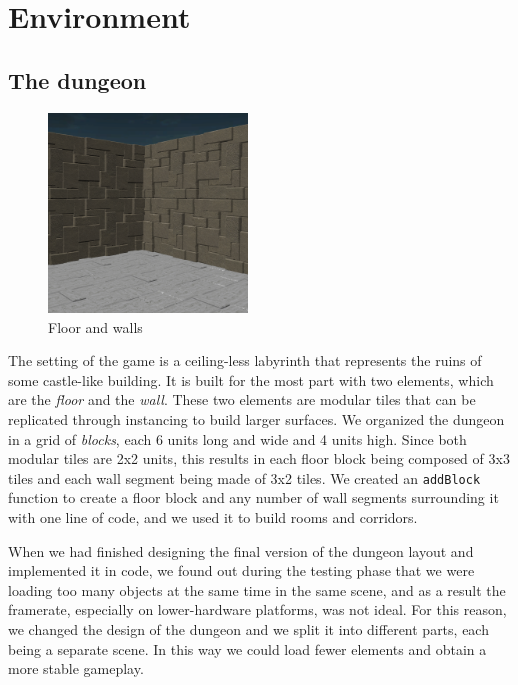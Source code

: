 
\chapter{Environment}

\section{The dungeon}

\begin{figure}
    \centering
    \vspace{-15pt}
    \includegraphics[width=150pt]{images/ch4/floor-walls.png}
    \caption{Floor and walls}
\end{figure}

The setting of the game is a ceiling-less labyrinth that represents the ruins of some castle-like building. It is built for the most part with two elements, which are the \textit{floor} and the \textit{wall}.
These two elements are modular tiles that can be replicated through instancing to build larger surfaces. We organized the dungeon in a grid of \textit{blocks}, each 6 units long and wide and 4 units high. Since both modular tiles are 2x2 units, this results in each floor block being composed of 3x3 tiles and each wall segment being made of 3x2 tiles. We created an \texttt{addBlock} function to create a floor block and any number of wall segments surrounding it with one line of code, and we used it to build rooms and corridors.

When we had finished designing the final version of the dungeon layout and implemented it in code, we found out during the testing phase that we were loading too many objects at the same time in the same scene, and as a result the framerate, especially on lower-hardware platforms, was not ideal. For this reason, we changed the design of the dungeon and we split it into different parts, each being a separate scene. In this way we could load fewer elements and obtain a more stable gameplay.


